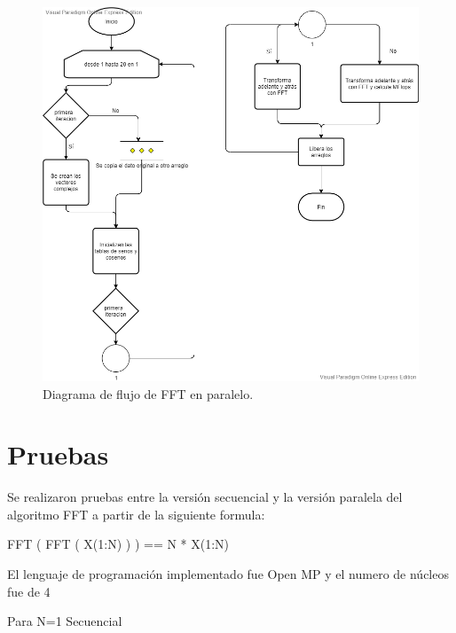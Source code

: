 \documentclass{report}
\begin{document}
\begin{figure}[h!]
    \centering
    \includegraphics[scale=0.5]{Images/FFT_Paralelo.png}
    \caption{Diagrama de flujo de FFT en paralelo.}
\end{figure}

\clearpage
\section*{Pruebas}
Se realizaron pruebas entre la versión secuencial y la versión paralela  del algoritmo FFT a partir de la siguiente formula:\medskip
 
FFT ( FFT ( X(1:N) ) ) == N * X(1:N)\medskip

El lenguaje de programación implementado fue Open MP y el numero de núcleos fue de 4\medskip

Para N=1 Secuencial
\end{document}
